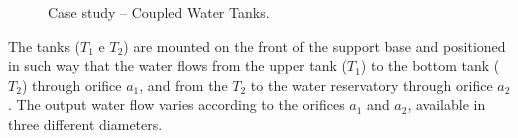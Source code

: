 \documentclass[10pt,fleqn,a4paper]{article}
\begin{document}
\begin{figure}[htb]
\centering
{}
\qquad
{}
    \caption{Case study -- Coupled Water Tanks.}
\end{figure}

The tanks ($T_1$ e $T_2$) are mounted on the front of the support base and
positioned in such way that the water flows from the upper tank ($T_1$) to the
bottom tank ($T_2$) through orifice $a_1$, and from the $T_2$ to the water
reservatory through orifice $a_2$. The output water flow varies according to the
orifices $a_1$ and $a_2$, available in three different diameters.
\end{document}
